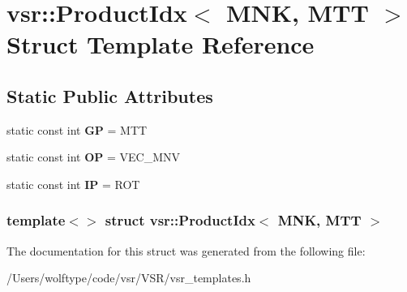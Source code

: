 \hypertarget{structvsr_1_1_product_idx_3_01_m_n_k_00_01_m_t_t_01_4}{\section{vsr\-:\-:Product\-Idx$<$ M\-N\-K, M\-T\-T $>$ Struct Template Reference}
\label{structvsr_1_1_product_idx_3_01_m_n_k_00_01_m_t_t_01_4}
}
\subsection*{Static Public Attributes}
\begin{DoxyCompactItemize}
\item 
\hypertarget{structvsr_1_1_product_idx_3_01_m_n_k_00_01_m_t_t_01_4_affdb40c3d1ce8a3039ee664c38606617}{static const int {\bfseries G\-P} = M\-T\-T}\label{structvsr_1_1_product_idx_3_01_m_n_k_00_01_m_t_t_01_4_affdb40c3d1ce8a3039ee664c38606617}

\item 
\hypertarget{structvsr_1_1_product_idx_3_01_m_n_k_00_01_m_t_t_01_4_a1f16e0c27f502c8de748892de342ea0c}{static const int {\bfseries O\-P} = V\-E\-C\-\_\-\-M\-N\-V}\label{structvsr_1_1_product_idx_3_01_m_n_k_00_01_m_t_t_01_4_a1f16e0c27f502c8de748892de342ea0c}

\item 
\hypertarget{structvsr_1_1_product_idx_3_01_m_n_k_00_01_m_t_t_01_4_a10112175c0a47d9d6a0726645fa4b3d1}{static const int {\bfseries I\-P} = R\-O\-T}\label{structvsr_1_1_product_idx_3_01_m_n_k_00_01_m_t_t_01_4_a10112175c0a47d9d6a0726645fa4b3d1}

\end{DoxyCompactItemize}
\subsubsection*{template$<$$>$ struct vsr\-::\-Product\-Idx$<$ M\-N\-K, M\-T\-T $>$}



The documentation for this struct was generated from the following file\-:\begin{DoxyCompactItemize}
\item 
/\-Users/wolftype/code/vsr/\-V\-S\-R/vsr\-\_\-templates.\-h\end{DoxyCompactItemize}
